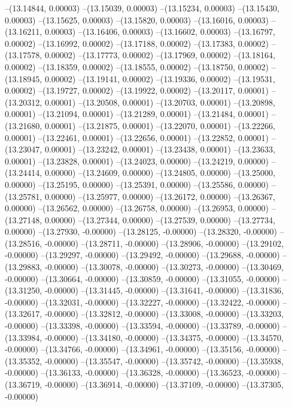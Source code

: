 --(13.14844, 0.00003)
--(13.15039, 0.00003)
--(13.15234, 0.00003)
--(13.15430, 0.00003)
--(13.15625, 0.00003)
--(13.15820, 0.00003)
--(13.16016, 0.00003)
--(13.16211, 0.00003)
--(13.16406, 0.00003)
--(13.16602, 0.00003)
--(13.16797, 0.00002)
--(13.16992, 0.00002)
--(13.17188, 0.00002)
--(13.17383, 0.00002)
--(13.17578, 0.00002)
--(13.17773, 0.00002)
--(13.17969, 0.00002)
--(13.18164, 0.00002)
--(13.18359, 0.00002)
--(13.18555, 0.00002)
--(13.18750, 0.00002)
--(13.18945, 0.00002)
--(13.19141, 0.00002)
--(13.19336, 0.00002)
--(13.19531, 0.00002)
--(13.19727, 0.00002)
--(13.19922, 0.00002)
--(13.20117, 0.00001)
--(13.20312, 0.00001)
--(13.20508, 0.00001)
--(13.20703, 0.00001)
--(13.20898, 0.00001)
--(13.21094, 0.00001)
--(13.21289, 0.00001)
--(13.21484, 0.00001)
--(13.21680, 0.00001)
--(13.21875, 0.00001)
--(13.22070, 0.00001)
--(13.22266, 0.00001)
--(13.22461, 0.00001)
--(13.22656, 0.00001)
--(13.22852, 0.00001)
--(13.23047, 0.00001)
--(13.23242, 0.00001)
--(13.23438, 0.00001)
--(13.23633, 0.00001)
--(13.23828, 0.00001)
--(13.24023, 0.00000)
--(13.24219, 0.00000)
--(13.24414, 0.00000)
--(13.24609, 0.00000)
--(13.24805, 0.00000)
--(13.25000, 0.00000)
--(13.25195, 0.00000)
--(13.25391, 0.00000)
--(13.25586, 0.00000)
--(13.25781, 0.00000)
--(13.25977, 0.00000)
--(13.26172, 0.00000)
--(13.26367, 0.00000)
--(13.26562, 0.00000)
--(13.26758, 0.00000)
--(13.26953, 0.00000)
--(13.27148, 0.00000)
--(13.27344, 0.00000)
--(13.27539, 0.00000)
--(13.27734, 0.00000)
--(13.27930, -0.00000)
--(13.28125, -0.00000)
--(13.28320, -0.00000)
--(13.28516, -0.00000)
--(13.28711, -0.00000)
--(13.28906, -0.00000)
--(13.29102, -0.00000)
--(13.29297, -0.00000)
--(13.29492, -0.00000)
--(13.29688, -0.00000)
--(13.29883, -0.00000)
--(13.30078, -0.00000)
--(13.30273, -0.00000)
--(13.30469, -0.00000)
--(13.30664, -0.00000)
--(13.30859, -0.00000)
--(13.31055, -0.00000)
--(13.31250, -0.00000)
--(13.31445, -0.00000)
--(13.31641, -0.00000)
--(13.31836, -0.00000)
--(13.32031, -0.00000)
--(13.32227, -0.00000)
--(13.32422, -0.00000)
--(13.32617, -0.00000)
--(13.32812, -0.00000)
--(13.33008, -0.00000)
--(13.33203, -0.00000)
--(13.33398, -0.00000)
--(13.33594, -0.00000)
--(13.33789, -0.00000)
--(13.33984, -0.00000)
--(13.34180, -0.00000)
--(13.34375, -0.00000)
--(13.34570, -0.00000)
--(13.34766, -0.00000)
--(13.34961, -0.00000)
--(13.35156, -0.00000)
--(13.35352, -0.00000)
--(13.35547, -0.00000)
--(13.35742, -0.00000)
--(13.35938, -0.00000)
--(13.36133, -0.00000)
--(13.36328, -0.00000)
--(13.36523, -0.00000)
--(13.36719, -0.00000)
--(13.36914, -0.00000)
--(13.37109, -0.00000)
--(13.37305, -0.00000)

